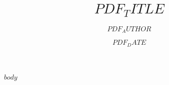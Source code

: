 \documentclass[\TFontSize]{scrartcl}
\date{$PDF_DATE$}
\title{$PDF_TITLE$}
\author{$PDF_AUTHOR$}
\begin{document}

% 
% 
%
%
%

\renewcommand*{\contentsname}{Inhaltsverzeichnis}
\setstretch{\TTOCStretch}
\tableofcontents
\pagebreak

$body$

\end{document}
